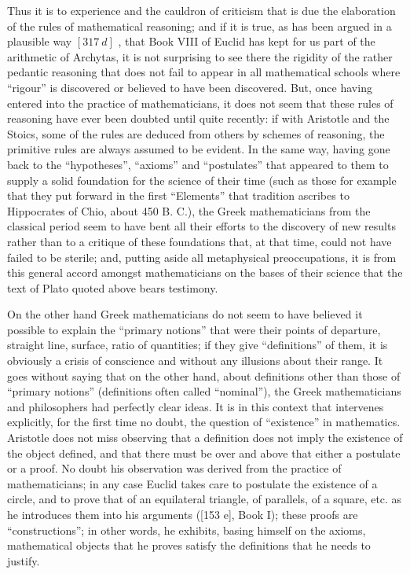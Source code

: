 Thus it is to experience and the cauldron of criticism that is due the elaboration of the rules of mathematical reasoning; and if it is true, as has been argued in a plausible way \([317\ d]\) , that Book VIII of Euclid has kept for us part of the arithmetic of Archytas, it is not surprising to see there the rigidity of the rather pedantic reasoning that does not fail to appear in all mathematical schools where ``rigour'' is discovered or believed to have been discovered. But, once having entered into the practice of mathematicians, it does not seem that these rules of reasoning have ever been doubted until quite recently: if with Aristotle and the Stoics, some of the rules are deduced from others by schemes of reasoning, the primitive rules are always assumed to be evident. In the same way, having gone back to the ``hypotheses'', ``axioms'' and ``postulates'' that appeared to them to supply a solid foundation for the science of their time (such as those for example that they put forward in the first ``Elements'' that tradition ascribes to Hippocrates of Chio, about 450 B. C.), the Greek mathematicians from the classical period seem to have bent all their efforts to the discovery of new results rather than to a critique of these foundations that, at that time, could not have failed to be sterile; and, putting aside all metaphysical preoccupations, it is from this general accord amongst mathematicians on the bases of their science that the text of Plato quoted above bears testimony.

On the other hand Greek mathematicians do not seem to have believed it possible to explain the ``primary notions'' that were their points of departure, straight line, surface, ratio of quantities; if they give ``definitions'' of them, it is obviously a crisis of conscience and without any illusions about their range. It goes without saying that on the other hand, about definitions other than those of ``primary notions'' (definitions often called ``nominal''), the Greek mathematicians and philosophers had perfectly clear ideas. It is in this context that intervenes explicitly, for the first time no doubt, the question of ``existence'' in mathematics. Aristotle does not miss observing that a definition does not imply the existence of the object defined, and that there must be over and above that either a postulate or a proof. No doubt his observation was derived from the practice of mathematicians; in any case Euclid takes care to postulate the existence of a circle, and to prove that of an equilateral triangle, of parallels, of a square, etc. as he introduces them into his arguments ({[}153 e{]}, Book I); these proofs are ``constructions''; in other words, he exhibits, basing himself on the axioms, mathematical objects that he proves satisfy the definitions that he needs to justify.

